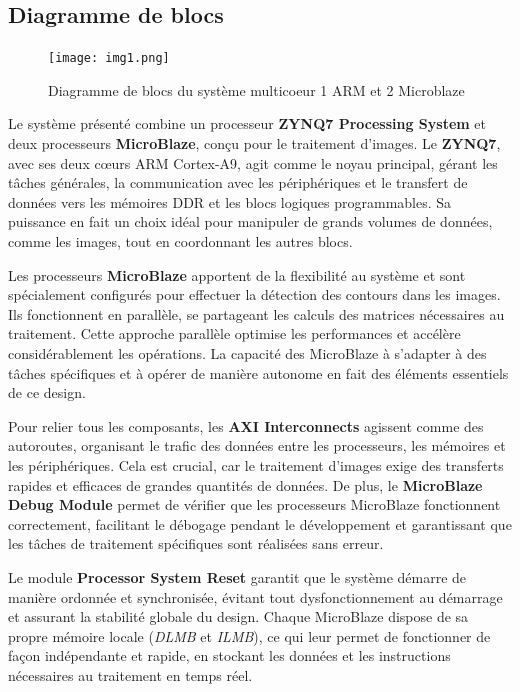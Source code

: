 \documentclass[../CSC_5RO07_TA.tex]{subfiles}
\begin{document}
\subsection{Diagramme de blocs}

\begin{figure}[H]
    \centering
    \texttt{[image: img1.png]}
    \caption{Diagramme de blocs du système multicoeur 1 ARM et 2 Microblaze}
    \label{fig:3}
\end{figure}

Le système présenté combine un processeur \textbf{ZYNQ7 Processing System} et deux processeurs \textbf{MicroBlaze}, conçu pour le traitement d'images. Le \textbf{ZYNQ7}, avec ses deux cœurs ARM Cortex-A9, agit comme le noyau principal, gérant les tâches générales, la communication avec les périphériques et le transfert de données vers les mémoires DDR et les blocs logiques programmables. Sa puissance en fait un choix idéal pour manipuler de grands volumes de données, comme les images, tout en coordonnant les autres blocs.

\vspace{1em} 

Les processeurs \textbf{MicroBlaze} apportent de la flexibilité au système et sont spécialement configurés pour effectuer la détection des contours dans les images. Ils fonctionnent en parallèle, se partageant les calculs des matrices nécessaires au traitement. Cette approche parallèle optimise les performances et accélère considérablement les opérations. La capacité des MicroBlaze à s'adapter à des tâches spécifiques et à opérer de manière autonome en fait des éléments essentiels de ce design.

\vspace{1em} 

Pour relier tous les composants, les \textbf{AXI Interconnects} agissent comme des autoroutes, organisant le trafic des données entre les processeurs, les mémoires et les périphériques. Cela est crucial, car le traitement d’images exige des transferts rapides et efficaces de grandes quantités de données. De plus, le \textbf{MicroBlaze Debug Module} permet de vérifier que les processeurs MicroBlaze fonctionnent correctement, facilitant le débogage pendant le développement et garantissant que les tâches de traitement spécifiques sont réalisées sans erreur.

\vspace{1em} 

Le module \textbf{Processor System Reset} garantit que le système démarre de manière ordonnée et synchronisée, évitant tout dysfonctionnement au démarrage et assurant la stabilité globale du design. Chaque MicroBlaze dispose de sa propre mémoire locale (\textit{DLMB} et \textit{ILMB}), ce qui leur permet de fonctionner de façon indépendante et rapide, en stockant les données et les instructions nécessaires au traitement en temps réel.
\end{document}
